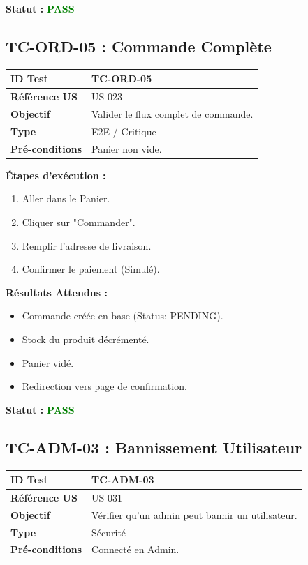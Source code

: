 \documentclass[12pt,a4paper]{article}
\begin{document}
\vspace{0.5cm}
\textbf{Statut :} \textcolor{green}{\textbf{PASS}}

\subsection{TC-ORD-05 : Commande Complète}

\begin{tabular}{|l|p{10cm}|}
    \hline
    \textbf{ID Test} & TC-ORD-05 \\ \hline
    \textbf{Référence US} & US-023 \\ \hline
    \textbf{Objectif} & Valider le flux complet de commande. \\ \hline
    \textbf{Type} & E2E / Critique \\ \hline
    \textbf{Pré-conditions} & Panier non vide. \\ \hline
\end{tabular}

\vspace{0.5cm}
\textbf{Étapes d'exécution :}
\begin{enumerate}
    \item Aller dans le Panier.
    \item Cliquer sur "Commander".
    \item Remplir l'adresse de livraison.
    \item Confirmer le paiement (Simulé).
\end{enumerate}

\vspace{0.5cm}
\textbf{Résultats Attendus :}
\begin{itemize}
    \item Commande créée en base (Status: PENDING).
    \item Stock du produit décrémenté.
    \item Panier vidé.
    \item Redirection vers page de confirmation.
\end{itemize}

\vspace{0.5cm}
\textbf{Statut :} \textcolor{green}{\textbf{PASS}}

\subsection{TC-ADM-03 : Bannissement Utilisateur}

\begin{tabular}{|l|p{10cm}|}
    \hline
    \textbf{ID Test} & TC-ADM-03 \\ \hline
    \textbf{Référence US} & US-031 \\ \hline
    \textbf{Objectif} & Vérifier qu'un admin peut bannir un utilisateur. \\ \hline
    \textbf{Type} & Sécurité \\ \hline
    \textbf{Pré-conditions} & Connecté en Admin. \\ \hline
\end{tabular}
\end{document}
